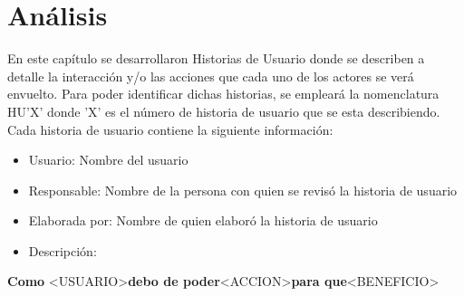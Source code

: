 \chapter{Análisis} \label{chap: historias de usuario}
En este capítulo se desarrollaron Historias de Usuario donde se describen a detalle la interacción y/o las acciones que cada uno de los actores se verá envuelto. Para poder identificar dichas historias, se empleará la nomenclatura HU'X' donde 'X' es el número de historia de usuario que se esta describiendo.
\\
Cada historia de usuario contiene la siguiente información:

\begin{itemize}
	\item Usuario: Nombre del usuario
	\item Responsable: Nombre de la persona con quien se revisó la historia de usuario
	\item Elaborada por: Nombre de quien elaboró la historia de usuario
	\item Descripción:
\end{itemize}

	\textbf{Como} \textless USUARIO\textgreater \textbf{debo de poder}\textless ACCION\textgreater \textbf{para que}\textless BENEFICIO\textgreater

\clearpage


\clearpage

\vspace{2cm}

\clearpage

\vspace{2cm}

\clearpage

\vspace{2cm}

\clearpage

\vspace{2cm}

